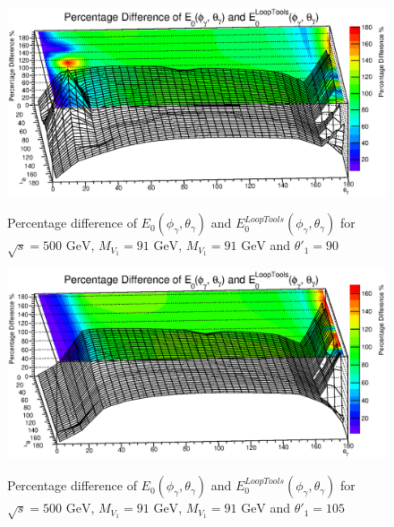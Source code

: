 \begin{figure}
	\begin{center}
		\includegraphics[scale=0.55]{90PD3.eps}\\
		\caption{ Percentage difference of $E_0(\phi_\gamma,\theta_\gamma)$ and $E_0^{LoopTools}(\phi_\gamma,\theta_\gamma)$ for $\sqrt{s}=500\text{ GeV}$, $M_{V_1}=91\text{ GeV}$, $M_{V_1}=91\text{ GeV}$ and $\theta'_1=90$ }
	\end{center}
\end{figure}

\begin{figure}
	\begin{center}
		\includegraphics[scale=0.55]{105PD3.eps}\\
		\caption{ Percentage difference of $E_0(\phi_\gamma,\theta_\gamma)$ and $E_0^{LoopTools}(\phi_\gamma,\theta_\gamma)$ for $\sqrt{s}=500\text{ GeV}$, $M_{V_1}=91\text{ GeV}$, $M_{V_1}=91\text{ GeV}$ and $\theta'_1=105$ }
	\end{center}
\end{figure}

